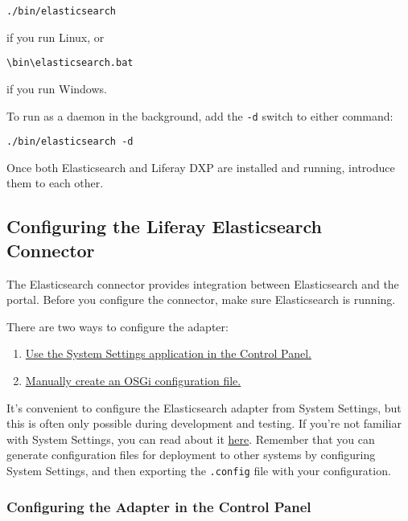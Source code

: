 \begin{verbatim}
./bin/elasticsearch
\end{verbatim}

if you run Linux, or

\begin{verbatim}
\bin\elasticsearch.bat
\end{verbatim}

if you run Windows.

To run as a daemon in the background, add the \texttt{-d} switch to
either command:

\begin{verbatim}
./bin/elasticsearch -d
\end{verbatim}

Once both Elasticsearch and Liferay DXP are installed and running,
introduce them to each other.

\subsection{Configuring the Liferay Elasticsearch
Connector}\label{configuring-the-liferay-elasticsearch-connector-1}

The Elasticsearch connector provides integration between Elasticsearch
and the portal. Before you configure the connector, make sure
Elasticsearch is running.

There are two ways to configure the adapter:

\begin{enumerate}
\def\labelenumi{\arabic{enumi}.}
\item
  \hyperref[configuring-the-adapter-in-the-control-panel]{Use the System
  Settings application in the Control Panel.}
\item
  \hyperref[configuring-the-adapter-with-an-osgi-config-file]{Manually
  create an OSGi configuration file.}
\end{enumerate}

It's convenient to configure the Elasticsearch adapter from System
Settings, but this is often only possible during development and
testing. If you're not familiar with System Settings, you can read about
it \href{/docs/7-1/user/-/knowledge_base/u/system-settings}{here}.
Remember that you can generate configuration files for deployment to
other systems by configuring System Settings, and then exporting the
\texttt{.config} file with your configuration.

\subsubsection{Configuring the Adapter in the Control
Panel}\label{configuring-the-adapter-in-the-control-panel}


